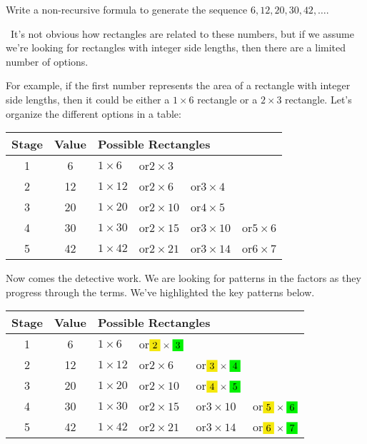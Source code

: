\begin{boxedex}
Write a non-recursive formula to generate the sequence $6, 12, 20, 30, 42, \dotsc$.

\exsoln\ It's not obvious how rectangles are related to these numbers, but if we assume we're looking for rectangles with integer side lengths, then there are a limited number of options.

For example, if the first number represents the area of a rectangle with integer side lengths, then it could be either a $1\times6$ rectangle or a $2\times3$ rectangle. Let's organize the different options in a table:

\begin{center}
\begin{tabular}{c|c|llll}
Stage		& Value		& \multicolumn{4}{l}{Possible Rectangles}
\\\hline
1			& 6			& $1 \times 6$
						& or\quad $2 \times 3$
						& ~
\\
2			& 12		& $1 \times 12$
						& or\quad $2 \times 6$
						& or\quad $3 \times 4$
\\
3			& 20		& $1 \times 20$
						& or\quad $2 \times 10$
						& or\quad $4 \times 5$
\\
4			& 30		& $1 \times 30$
						& or\quad $2 \times 15$
						& or\quad $3 \times 10$
						& or\quad $5 \times 6$
\\
5			& 42		& $1 \times 42$
						& or\quad $2 \times 21$
						& or\quad $3 \times 14$
						& or\quad $6 \times 7$
\\
\end{tabular}
\end{center}

Now comes the detective work. We are looking for patterns in the factors as they progress through the terms. We've highlighted the key patterns below.

\begin{center}
\begin{tabular}{c|c|llll}
Stage		& Value		& \multicolumn{4}{l}{Possible Rectangles}
\\\hline
1			& 6			& $1 \times 6$
						& or\quad $\colorbox{yellow!95!black}{2} \times \colorbox{green!95!black}{3}$
						& ~
\\
2			& 12		& $1 \times 12$
						& or\quad $2 \times 6$
						& or\quad $\colorbox{yellow!95!black}{3} \times \colorbox{green!95!black}{4}$
\\
3			& 20		& $1 \times 20$
						& or\quad $2 \times 10$
						& or\quad $\colorbox{yellow!95!black}{4} \times \colorbox{green!95!black}{5}$
\\
4			& 30		& $1 \times 30$
						& or\quad $2 \times 15$
						& or\quad $3 \times 10$
						& or\quad $\colorbox{yellow!95!black}{5} \times \colorbox{green!95!black}{6}$
\\
5			& 42		& $1 \times 42$
						& or\quad $2 \times 21$
						& or\quad $3 \times 14$
						& or\quad $\colorbox{yellow!95!black}{6} \times \colorbox{green!95!black}{7}$
\end{tabular}
\end{center}


\end{boxedex}
